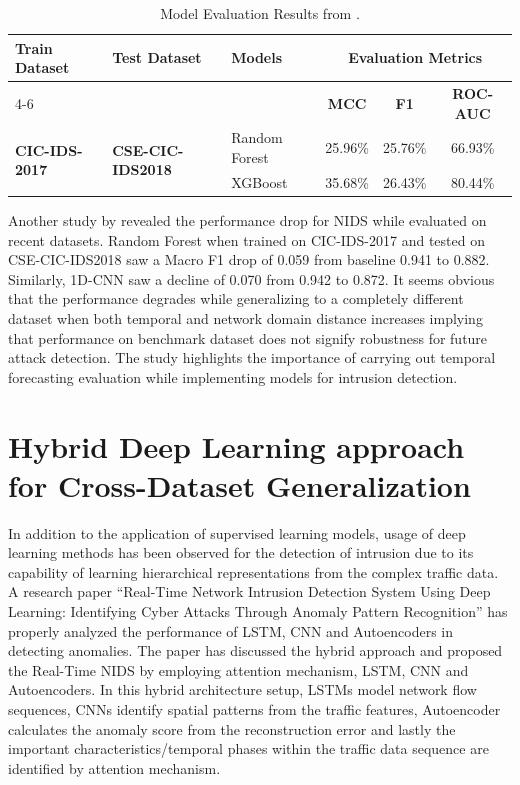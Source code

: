 \begin{table}[ht]
    \centering
    \caption{ Model Evaluation Results from \cite{Cantone2024}.}
    \label{tab:evaluation-results}

    \begin{tabular}{ll l c c c}
        \toprule
        {\small Train Dataset} & {\small Test Dataset} & {\small Models} &
        \multicolumn{3}{c}{\small Evaluation Metrics} \\
        \cmidrule(lr){4-6}
        & & & \textbf{{\small MCC}} & \textbf{{\small F1}} & \textbf{{\small ROC-AUC}} \\
        \midrule

        \multirow{3}{*}{\textbf{\small CIC-IDS-2017}}
        & \multirow{3}{*}{\textbf{\small CSE-CIC-IDS2018}}
        & {\small Random Forest} & {\small 25.96\%} & {\small 25.76\%} & {\small 66.93\%} \\

        & & {\small XGBoost} & {\small 35.68\%} & {\small 26.43\%} & {\small 80.44\%} \\

        \bottomrule
    \end{tabular}
\end{table}
\FloatBarrier

Another study by \cite{Elangovan2026} revealed the performance drop for NIDS while evaluated on recent datasets. Random Forest when trained 
on CIC-IDS-2017 and tested on CSE-CIC-IDS2018 saw a Macro F1 drop of 0.059 from baseline 0.941 to 0.882. Similarly, 1D-CNN saw a decline of 0.070 
from 0.942 to 0.872. It seems obvious that the performance degrades while generalizing to a completely different dataset when both temporal and 
network domain distance increases implying that performance on benchmark dataset does not signify robustness for future attack detection. The 
study highlights the importance of carrying out temporal forecasting evaluation while implementing models for intrusion detection.  

\section{Hybrid Deep Learning approach for Cross-Dataset Generalization}
In addition to the application of supervised learning models, usage of deep learning methods has been observed for the detection of intrusion due to 
its capability of learning hierarchical representations from the complex traffic data. A research paper “Real-Time Network Intrusion Detection System 
Using Deep Learning: Identifying Cyber Attacks Through Anomaly Pattern Recognition” \cite{Chandra2025} has properly analyzed the performance of LSTM, 
CNN and Autoencoders in detecting anomalies. The paper has discussed the hybrid approach and proposed the Real-Time NIDS by employing attention mechanism, LSTM, 
CNN and Autoencoders. In this hybrid architecture setup, LSTMs model network flow sequences, CNNs identify spatial patterns from the traffic features, Autoencoder 
calculates the anomaly score from the reconstruction error and lastly the important characteristics/temporal phases within the traffic data sequence are identified 
by attention mechanism.

